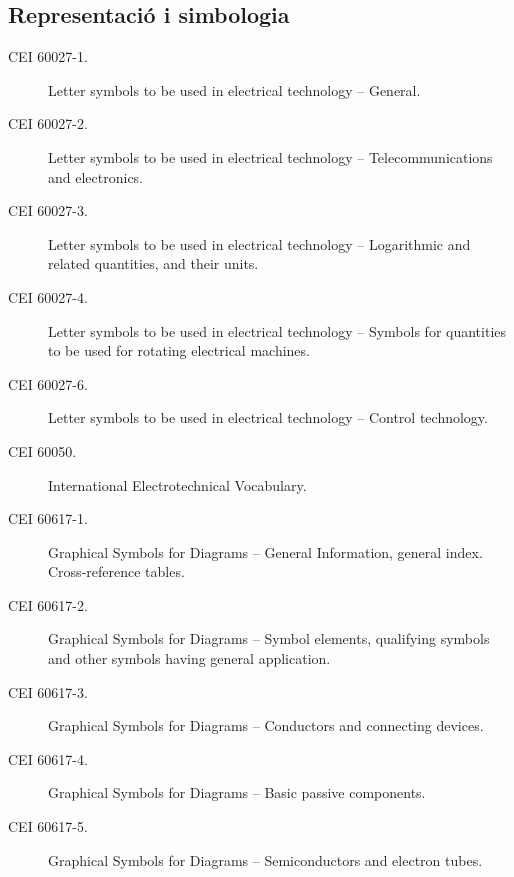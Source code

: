 \subsection*{Representació i simbologia}
\begin{description}
    \item [\hspace{5mm}CEI 60027-1.] Letter symbols to be used in electrical technology -- General.
    \item [\hspace{5mm}CEI 60027-2.] Letter symbols to be used in electrical technology -- Telecommunications and electronics.
    \item [\hspace{5mm}CEI 60027-3.] Letter symbols to be used in electrical technology -- Logarithmic and related quantities, and their units.
    \item [\hspace{5mm}CEI 60027-4.] Letter symbols to be used in electrical technology -- Symbols for quantities to be used for rotating electrical machines.
    \item [\hspace{5mm}CEI 60027-6.] Letter symbols to be used in electrical technology -- Control technology.
    \item [\hspace{5mm}CEI 60050.] International Electrotechnical Vocabulary. 
    \item [\hspace{5mm}CEI 60617-1.] Graphical Symbols for Diagrams -- General Information, general index. Cross-reference tables.
    \item [\hspace{5mm}CEI 60617-2.] Graphical Symbols for Diagrams -- Symbol elements, qualifying symbols and other symbols having general application.
    \item [\hspace{5mm}CEI 60617-3.] Graphical Symbols for Diagrams -- Conductors and connecting devices.
    \item [\hspace{5mm}CEI 60617-4.] Graphical Symbols for Diagrams -- Basic passive components.
    \item [\hspace{5mm}CEI 60617-5.] Graphical Symbols for Diagrams -- Semiconductors and electron tubes.

\end{description}
